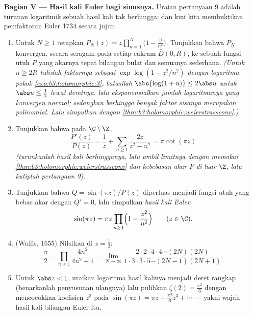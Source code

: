 \begin{problem}
\medskip
\noindent\textbf{Bagian V --- Hasil kali Euler bagi sinusnya.}
Uraian pertanyaan 9 adalah turunan logaritmik sebuah
hasil kali tak berhingga; dan kini kita membuktikan pemfaktoran Euler 1734
secara jujur.
\begin{enumerate}[resume]
  \item Untuk $N \geq 1$ tetapkan $P_N(z) =
        z\prod_{n=1}^{N}\bigl(1 - \frac{z^2}{n^2}\bigr)$.
        Tunjukkan bahwa $P_N$ konvergen, secara seragam pada setiap cakram
        $\bar D(0, R)$, ke sebuah fungsi utuh $P$ yang akarnya
        tepat bilangan bulat dan semuanya sederhana. \emph{(Untuk $n
        \geq 2R$ tulislah faktornya sebagai $\exp\log(1 -
        z^2/n^2)$ dengan logaritma pokok
        \cref{exo:b3:holomorphic:3}, batasilah $\abs{\log(1+u)}
        \leq 2\abs u$ untuk $\abs u \leq \frac12$ lewat
        deretnya, lalu eksponensialkan jumlah logaritmanya yang konvergen
        normal; sedangkan berhingga banyak faktor sisanya
        merupakan polinomial. Lalu simpulkan dengan
        \cref{thm:b3:holomorphic:weierstrassconv}.)}
  \item Tunjukkan bahwa pada $\C\setminus\Z$,
        \[
        \frac{P'(z)}{P(z)} = \frac1z +
        \sum_{n\geq1}\frac{2z}{z^2 - n^2} = \pi\cot(\pi z)
        \]
        \emph{(turunkanlah hasil kali berhingganya, lalu ambil
        limitnya dengan memakai
        \cref{thm:b3:holomorphic:weierstrassconv} dan
        kebebasan akar $P$ di luar $\Z$, lalu kutiplah pertanyaan
        9)}.
  \item Tunjukkan bahwa $Q = \sin(\pi z)/P(z)$ diperluas menjadi fungsi
        utuh yang bebas akar dengan $Q' = 0$, lalu
        simpulkan \emph{hasil kali Euler}:
        \[
        \sin(\pi z) = \pi z\prod_{n\geq1}
        \Bigl(1 - \frac{z^2}{n^2}\Bigr)
        \qquad (z \in \C) .
        \]
  \item (Wallis, 1655) Nilaikan di $z = \frac12$:
        \[
        \frac\pi2 = \prod_{n\geq1}\frac{4n^2}{4n^2 - 1}
        = \lim_{N\to\infty}
        \frac{2\cdot2\cdot4\cdot4\cdots(2N)(2N)}
        {1\cdot3\cdot3\cdot5\cdots(2N-1)(2N+1)} .
        \]
  \item Untuk $\abs z < 1$, uraikan logaritma
        hasil kalinya menjadi deret rangkap (benarkanlah
        penyusunan ulangnya) lalu pulihkan $\zeta(2) =
        \frac{\pi^2}6$ dengan mencocokkan koefisien $z^3$
        pada $\sin(\pi z) = \pi z - \frac{\pi^3}6z^3 + \cdots$
        --- yakni wajah hasil kali bilangan Euler itu.
\end{enumerate}


\end{problem}

